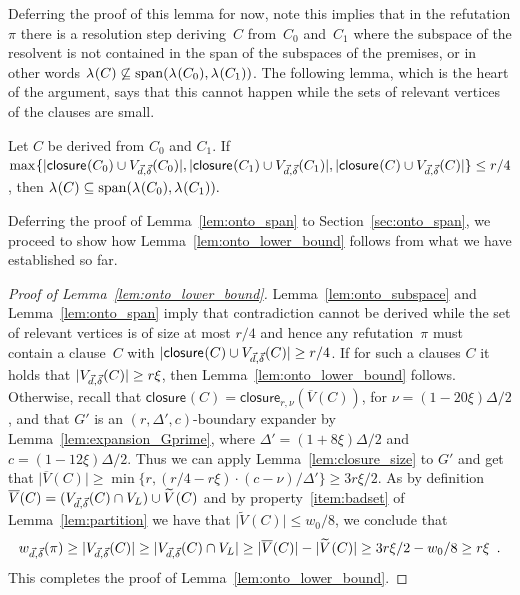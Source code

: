 \documentclass{theoretics}
\newcommand{\maxofexpr}[2][]{\max_{#1} \{ #2 \}}
\newcommand{\set}[1]{\{ #1 \}}
\newcommand{\setsize}[1]{\lvert#1\rvert}
\newcommand{\eqperiod}{\enspace .}
\newcommand{\reflem}[1]{Lemma~\ref{#1}}
\newcommand{\refpi}{\pi}
\newcommand{\genericformsmall}[2]{\mathit{#1}( #2 )}
\newcommand{\width}[2][]{\genericformsmall{W_{#1}}{#2}}
\newcommand{\diff}{\xi}
\newcommand{\GdegMax}{\Delta}
\newcommand{\gdegmax}{\GdegMax}
\newcommand{\V}[1][]{V_{#1}}
\newcommand{\Vl}{\V[L]}
\newcommand{\Gprime}{G'}
\newcommand{\GprimeConstantDeg}{8}
\newcommand{\GprimeConstantExp}{12}
\newcommand{\Vbad}[2][]{\widetilde V^{#1}(#2)}
\newcommand{\VbadThick}[1]{\overline V(#1)}
\newcommand{\vecthr}{\vec{d}}
\newcommand{\vecadv}{\vec{\delta}}
\newcommand{\linmap}[1][]{\ensuremath \lambda_{{#1}}}
\newcommand{\linmapof}[2][]{\linmap[#1](#2)}
\newcommand{\Vthick}[1]{\ensuremath V_{\vecthr,\vecadv}(#1)}
\renewcommand{\width}[1]{\ensuremath w_{\vecthr,\vecadv}( #1 )}
\newcommand{\closure}[2][]{\mathsf{closure}_{{#1}}(#2)}
\newcommand{\spans}[1]{\mathrm{span} ( #1 )}
\numberwithin{equation}{section}
\begin{document}
  Deferring the proof of this lemma for now, note 
  this implies that in the refutation
  $\refpi$ there is a resolution step deriving~$C$ from~$C_0$
  and~$C_1$ where the subspace of the resolvent is not contained
  in the span of the subspaces of the premises, or in other words
  $\linmapof{C} 
  \not\subseteq \spans{\linmapof{C_0}, \linmapof{C_1}}$.
  The following lemma, which is the heart of the argument, says that this
  cannot happen while the sets
  of relevant vertices of the clauses are small.

  \begin{lemma}\label{lem:onto_span}
    Let $C$ be derived from $C_0$ and $C_1$.
    If $
    \maxofexpr{
    \setsize{ \closure{C_0} \cup \Vthick{C_0} }, 
    \setsize{ \closure{C_1} \cup \Vthick{C_1} }, 
    \setsize{ \closure{C} \cup \Vthick{C} }
    } 
    \le r/4
    $,
    then
    $\linmapof{C} \subseteq \spans{\linmapof{C_0}, \linmapof{C_1}}.$
  \end{lemma}

  Deferring the proof of Lemma~\ref{lem:onto_span} to Section~\ref{sec:onto_span}, 
  we proceed to show how \reflem{lem:onto_lower_bound} follows from 
  what we have established so far.



  \begin{proof}[Proof of \reflem{lem:onto_lower_bound}]
  \reflem{lem:onto_subspace} and \reflem{lem:onto_span} imply that
  contradiction cannot be derived while the set of relevant
  vertices is of size at most $r/4$ and hence
  any refutation~$\refpi$ must contain a clause~$C$
  with
  $\setsize{\closure{C} \cup \Vthick{C}} \geq r/4$.
  If for such a clauses $C$ it holds that
  $\setsize{\Vthick{C}} \ge r\diff$, then \reflem{lem:onto_lower_bound} follows.
  Otherwise,
  recall that 
  $\closure{C} = \closure[r,\nu]{\VbadThick{C}}$, 
  for $\nu =  (1 - 20\diff)\gdegmax/2$, and that
  $\Gprime$ is an
  $(r, \gdegmax', c)$-boundary 
  expander by Lemma~\ref{lem:expansion_Gprime}, 
  where $\gdegmax' = (1 + \GprimeConstantDeg \diff) \GdegMax/2$
  and $c = (1 - \GprimeConstantExp  \diff)\GdegMax/2$. Thus we can 
  apply
  Lemma~\ref{lem:closure_size} to $G'$ and get that
  $\setsize{\VbadThick{C}}
  \ge \min\set{r, (r/4 - r \diff)\cdot \left( c - \nu \right) / \gdegmax'} 
  \ge 3r\diff / 2 $.
As by definition $\VbadThick{C} = (\Vthick{C} \cap \Vl) \cup \Vbad{C}$
  and by property~\ref{item:badset} of Lemma~\ref{lem:partition} we have that
  $\setsize{ \Vbad{C} } \leq w_0/8$, we conclude that
  \begin{equation}
    \width{\refpi} \ge \setsize{\Vthick{C}} 
    \ge \setsize{\Vthick{C} \cap \Vl} 
    \ge \setsize{ \VbadThick{C} } - \setsize{ \Vbad{C} }
    \ge 3r\diff/2  - w_0/8 
    \ge r\diff \eqperiod
  \end{equation}
  This completes the proof of \reflem{lem:onto_lower_bound}.
  \end{proof}
\end{document}

